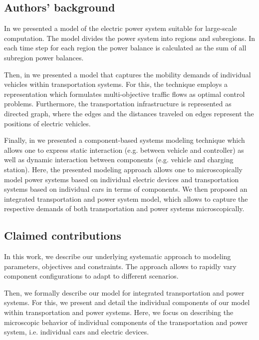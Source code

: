\subsection{Authors' background}
\label{backgrounds}

In \cite{Hackenberg2012} we presented a model of the electric power system suitable for large-scale computation. The model divides the power system into regions and subregions. In each time step for each region the power balance is calculated as the sum of all subregion power balances.

Then, in \cite{ascher2014early} we presented a model that captures the mobility demands of individual vehicles within transportation systems. For this, the technique employs a representation which formulates multi-objective traffic flows as optimal control problems. Furthermore, the transportation infrastructure is represented as directed graph, where the edges and the distances traveled on edges represent the positions of electric vehicles.

Finally, in \cite{ascher2015integrated} we presented a component-based systems modeling technique which allows one to express static interaction (e.g. between vehicle and controller) as well as dynamic interaction between components (e.g. vehicle and charging station). Here, the presented modeling approach allows one to microscopically model power systems based on individual electric devices and transportation systems based on individual cars in terms of components. We then proposed an integrated transportation and power system model, which allows to capture the respective demands of both transportation and power systems microscopically.

\subsection{Claimed contributions}
\label{contributions}

In this work, we describe our underlying systematic approach to modeling parameters, objectives and constraints. The approach allows to rapidly vary component configurations to adapt to different scenarios.

Then, we formally describe our model for integrated transportation and power systems. For this, we present and detail the individual components of our model within transportation and power systems. Here, we focus on describing the microscopic behavior of individual components of the transportation and power system, i.e. individual cars and electric devices.

